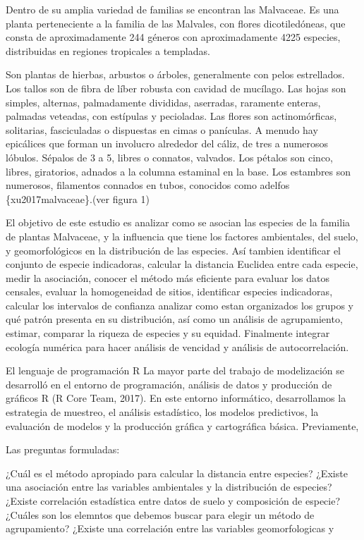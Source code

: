 \documentclass[11pt,]{article}
\begin{document}
Dentro de su amplia variedad de familias se encontran las Malvaceae. Es
una planta perteneciente a la familia de las Malvales, con flores
dicotiledóneas, que consta de aproximadamente 244 géneros con
aproximadamente 4225 especies, distribuidas en regiones tropicales a
templadas.

Son plantas de hierbas, arbustos o árboles, generalmente con pelos
estrellados. Los tallos son de fibra de líber robusta con cavidad de
mucílago. Las hojas son simples, alternas, palmadamente divididas,
aserradas, raramente enteras, palmadas veteadas, con estípulas y
pecioladas. Las flores son actinomórficas, solitarias, fasciculadas o
dispuestas en cimas o panículas. A menudo hay epicálices que forman un
involucro alrededor del cáliz, de tres a numerosos lóbulos. Sépalos de 3
a 5, libres o connatos, valvados. Los pétalos son cinco, libres,
giratorios, adnados a la columna estaminal en la base. Los estambres son
numerosos, filamentos connados en tubos, conocidos como adelfos
\{xu2017malvaceae\}.(ver figura 1)

El objetivo de este estudio es analizar como se asocian las especies de
la familia de plantas Malvaceae, y la influencia que tiene los factores
ambientales, del suelo, y geomorfológicos en la distribución de las
especies. Así tambien identificar el conjunto de especie indicadoras,
calcular la distancia Euclidea entre cada especie, medir la asociación,
conocer el método más eficiente para evaluar los datos censales, evaluar
la homogeneidad de sitios, identificar especies indicadoras, calcular
los intervalos de confianza analizar como estan organizados los grupos y
qué patrón presenta en su distribución, así como un análisis de
agrupamiento, estimar, comparar la riqueza de especies y su equidad.
Finalmente integrar ecología numérica para hacer análisis de vencidad y
análisis de autocorrelación.

El lenguaje de programación R La mayor parte del trabajo de modelización
se desarrolló en el entorno de programación, análisis de datos y
producción de gráficos R (R Core Team, 2017). En este entorno
informático, desarrollamos la estrategia de muestreo, el análisis
estadístico, los modelos predictivos, la evaluación de modelos y la
producción gráfica y cartográfica básica. Previamente,

Las preguntas formuladas:

¿Cuál es el método apropiado para calcular la distancia entre especies?
¿Existe una asociación entre las variables ambientales y la distribución
de especies? ¿Existe correlación estadística entre datos de suelo y
composición de especie? ¿Cuáles son los elemntos que debemos buscar para
elegir un método de agrupamiento? ¿Existe una correlación entre las
variables geomorfologicas y
\end{document}
